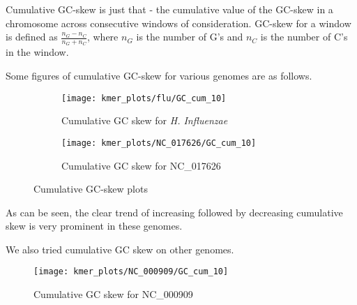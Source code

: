 \documentclass[10pt]{article}
\begin{document}
Cumulative GC-skew is just that - the cumulative value of the GC-skew in a chromosome across consecutive windows of consideration. GC-skew for a window is defined as $\frac{n_G-n_C}{n_G+n_C}$, where $n_G$ is the number of G's and $n_C$ is the number of C's in the window. 

Some figures of cumulative GC-skew for various genomes are as follows.




\begin{figure}[H]
\centering
\begin{subfigure}{.5\textwidth}
\centering
\texttt{[image: kmer\_plots/flu/GC\_cum\_10]}
\captionsetup{justification=centering}
\caption{Cumulative GC skew for \textit{H. Influenzae}}
\end{subfigure}%




\begin{subfigure}{.5\textwidth}
\centering
\texttt{[image: kmer\_plots/NC\_017626/GC\_cum\_10]}
\captionsetup{justification=centering}
\caption{Cumulative GC skew for NC\_017626 }
\end{subfigure}
\caption{Cumulative GC-skew plots}
\end{figure}

As can be seen, the clear trend of increasing followed by decreasing cumulative skew is very prominent in these genomes.

We also tried cumulative GC skew on other genomes.


\begin{figure}[H]
\centering
\texttt{[image: kmer\_plots/NC\_000909/GC\_cum\_10]}
\captionsetup{justification=centering}
\caption{Cumulative GC skew for NC\_000909 }
\end{figure}
\end{document}
